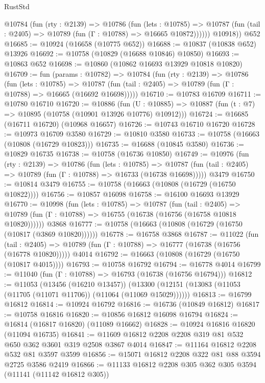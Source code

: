 \begin{lexlean}{RustStd}
\begin{coremodule}
          @10784
            (fun (rty : @2139) =>
            @10786
              (fun (lets : @10785) =>
              @10787 (fun (tail : @2405) => @10789 (fun (Γ : @10788) => @16665 @10872))))))
        @10918))
    @652
@16685 := @10924 (@16658 (@10775 @652))
@16688 := @10837 (@10838 @652) @13926
@16692 := @10758 (@10829 (@16688 @10846) @10850)
@16693 := @10863 @652
@16698 := @10860 (@10862 @16693 @13929 @10818 @10820)
@16709 := fun (params : @10782) =>
  @10784
    (fun (rty : @2139) =>
    @10786
      (fun (lets : @10785) =>
      @10787 (fun (tail : @2405) => @10789 (fun (Γ : @10788) => @16665 (@16692 @16698)))))
@16710 := @10783 @16709
@16711 := @10780 @16710
@16720 := @10886
    (fun (U : @10885) => @10887 (fun (t : @7) => @10895 (@10758 (@10901 @13926 @10776) @10912)))
@16724 := @16685 (@16711 @16720) (@10968 @16657)
@16726 := @10743 @16710 @16720
@16728 := @10973 @16709 @3580
@16729 := @10810 @3580
@16733 := @10758 (@16663 (@10808 (@16729 @10823)))
@16735 := @16688 (@10845 @3580)
@16736 := @10829 @16735
@16738 := @10758 (@16736 @10850)
@16749 := @10976
    (fun (rty : @2139) =>
    @10786
      (fun (lets : @10785) =>
      @10787 (fun (tail : @2405) => @10789 (fun (Γ : @10788) => @16733 (@16738 @16698)))))
    @3479
@16750 := @10814 @3479
@16755 := @10758 (@16663 (@10808 (@16729 (@16750 @10822))))
@16756 := @10857 @16098
@16758 := @16100 @16693 @13929
@16770 := @10998
    (fun (lets : @10785) =>
    @10787
      (fun (tail : @2405) =>
      @10789 (fun (Γ : @10788) => @16755 (@16738 (@16756 (@16758 @10818 @10820))))))
    @3868
@16777 := @10758 (@16663 (@10808 (@16729 (@16750 (@10817 (@3869 @10820))))))
@16778 := @16758 @3868
@16787 := @11022
    (fun (tail : @2405) => @10789 (fun (Γ : @10788) => @16777 (@16738 (@16756 (@16778 @10820)))))
    @4014
@16792 := @16663 (@10808 (@16729 (@16750 (@10817 @4015))))
@16793 := @10758 @16792
@16794 := @16778 @4014
@16799 := @11040 (fun (Γ : @10788) => @16793 (@16738 (@16756 @16794)))
@16812 := @11053
    (@13456 (@16210 @13457))
    (@13300 (@12151 (@13083 (@11053 (@11705 (@11071 @11706)) (@11064 (@11069 @15029))))))
@16813 := @16799 @16812
@16814 := @10924 @16792
@16816 := @16736 (@10849 @16812)
@16817 := @10758 @16816
@16820 := @10856 @16812 @16098 @16794
@16824 := @16814 (@16817 @16820) (@11089 @16662)
@16828 := @10924 @16816 @16820 (@11094 @16735)
@16841 := @11609 @16812 @2208 @2208 @319 @81 @532 @650 @362 @3601 @319 @2508 @3867 @4014
@16847 := @11164 @16812 @2208 @532 @81 @3597 @3599
@16856 := @15071 @16812 @2208 @322 @81 @88 @3594 @2725 @3586 @2419
@16866 := @11133 @16812 @2208 @305 @362 @305 @3594 (@11141 (@11142 @16812 @305))

\end{coremodule}
\end{lexlean}
